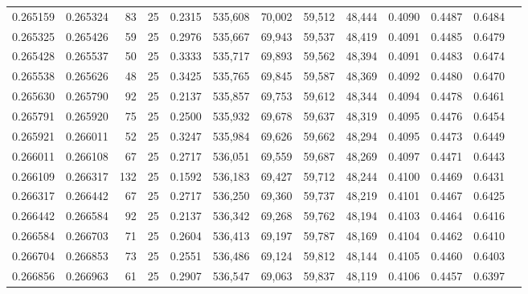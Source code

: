 \begin{tabular}{rrrrrrrrrrrrr}
0.265159 & 0.265324 &    83 &  25 &                                     0.2315 & 535,608 &  70,002 &  59,512 &  48,444 & 0.4090 & 0.4487 & 0.6484 \\
0.265325 & 0.265426 &    59 &  25 &                                     0.2976 & 535,667 &  69,943 &  59,537 &  48,419 & 0.4091 & 0.4485 & 0.6479 \\
0.265428 & 0.265537 &    50 &  25 &                                     0.3333 & 535,717 &  69,893 &  59,562 &  48,394 & 0.4091 & 0.4483 & 0.6474 \\
0.265538 & 0.265626 &    48 &  25 &                                     0.3425 & 535,765 &  69,845 &  59,587 &  48,369 & 0.4092 & 0.4480 & 0.6470 \\
0.265630 & 0.265790 &    92 &  25 &                                     0.2137 & 535,857 &  69,753 &  59,612 &  48,344 & 0.4094 & 0.4478 & 0.6461 \\
0.265791 & 0.265920 &    75 &  25 &                                     0.2500 & 535,932 &  69,678 &  59,637 &  48,319 & 0.4095 & 0.4476 & 0.6454 \\
0.265921 & 0.266011 &    52 &  25 &                                     0.3247 & 535,984 &  69,626 &  59,662 &  48,294 & 0.4095 & 0.4473 & 0.6449 \\
0.266011 & 0.266108 &    67 &  25 &                                     0.2717 & 536,051 &  69,559 &  59,687 &  48,269 & 0.4097 & 0.4471 & 0.6443 \\
0.266109 & 0.266317 &   132 &  25 &                                     0.1592 & 536,183 &  69,427 &  59,712 &  48,244 & 0.4100 & 0.4469 & 0.6431 \\
0.266317 & 0.266442 &    67 &  25 &                                     0.2717 & 536,250 &  69,360 &  59,737 &  48,219 & 0.4101 & 0.4467 & 0.6425 \\
0.266442 & 0.266584 &    92 &  25 &                                     0.2137 & 536,342 &  69,268 &  59,762 &  48,194 & 0.4103 & 0.4464 & 0.6416 \\
0.266584 & 0.266703 &    71 &  25 &                                     0.2604 & 536,413 &  69,197 &  59,787 &  48,169 & 0.4104 & 0.4462 & 0.6410 \\
0.266704 & 0.266853 &    73 &  25 &                                     0.2551 & 536,486 &  69,124 &  59,812 &  48,144 & 0.4105 & 0.4460 & 0.6403 \\
0.266856 & 0.266963 &    61 &  25 &                                     0.2907 & 536,547 &  69,063 &  59,837 &  48,119 & 0.4106 & 0.4457 & 0.6397 \\

\end{tabular}
